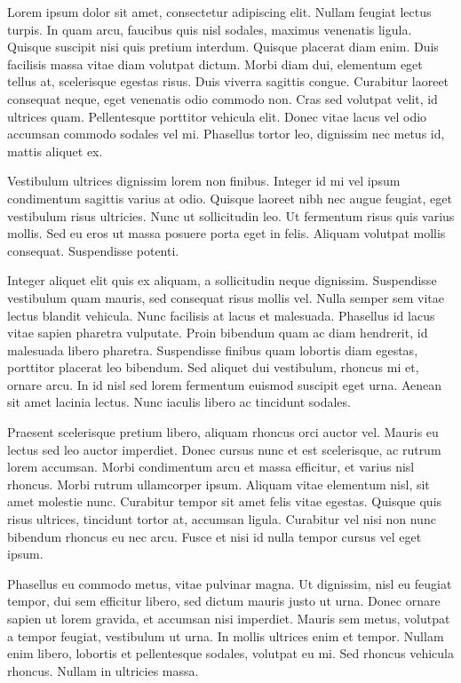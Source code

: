 Lorem ipsum dolor sit amet, consectetur adipiscing elit. Nullam feugiat lectus turpis. In quam arcu, faucibus quis nisl sodales, maximus venenatis ligula. Quisque suscipit nisi quis pretium interdum. Quisque placerat diam enim. Duis facilisis massa vitae diam volutpat dictum. Morbi diam dui, elementum eget tellus at, scelerisque egestas risus. Duis viverra sagittis congue. Curabitur laoreet consequat neque, eget venenatis odio commodo non. Cras sed volutpat velit, id ultrices quam. Pellentesque porttitor vehicula elit. Donec vitae lacus vel odio accumsan commodo sodales vel mi. Phasellus tortor leo, dignissim nec metus id, mattis aliquet ex.

Vestibulum ultrices dignissim lorem non finibus. Integer id mi vel ipsum condimentum sagittis varius at odio. Quisque laoreet nibh nec augue feugiat, eget vestibulum risus ultricies. Nunc ut sollicitudin leo. Ut fermentum risus quis varius mollis. Sed eu eros ut massa posuere porta eget in felis. Aliquam volutpat mollis consequat. Suspendisse potenti.

Integer aliquet elit quis ex aliquam, a sollicitudin neque dignissim. Suspendisse vestibulum quam mauris, sed consequat risus mollis vel. Nulla semper sem vitae lectus blandit vehicula. Nunc facilisis at lacus et malesuada. Phasellus id lacus vitae sapien pharetra vulputate. Proin bibendum quam ac diam hendrerit, id malesuada libero pharetra. Suspendisse finibus quam lobortis diam egestas, porttitor placerat leo bibendum. Sed aliquet dui vestibulum, rhoncus mi et, ornare arcu. In id nisl sed lorem fermentum euismod suscipit eget urna. Aenean sit amet lacinia lectus. Nunc iaculis libero ac tincidunt sodales.

Praesent scelerisque pretium libero, aliquam rhoncus orci auctor vel. Mauris eu lectus sed leo auctor imperdiet. Donec cursus nunc et est scelerisque, ac rutrum lorem accumsan. Morbi condimentum arcu et massa efficitur, et varius nisl rhoncus. Morbi rutrum ullamcorper ipsum. Aliquam vitae elementum nisl, sit amet molestie nunc. Curabitur tempor sit amet felis vitae egestas. Quisque quis risus ultrices, tincidunt tortor at, accumsan ligula. Curabitur vel nisi non nunc bibendum rhoncus eu nec arcu. Fusce et nisi id nulla tempor cursus vel eget ipsum.

Phasellus eu commodo metus, vitae pulvinar magna. Ut dignissim, nisl eu feugiat tempor, dui sem efficitur libero, sed dictum mauris justo ut urna. Donec ornare sapien ut lorem gravida, et accumsan nisi imperdiet. Mauris sem metus, volutpat a tempor feugiat, vestibulum ut urna. In mollis ultrices enim et tempor. Nullam enim libero, lobortis et pellentesque sodales, volutpat eu mi. Sed rhoncus vehicula rhoncus. Nullam in ultricies massa.